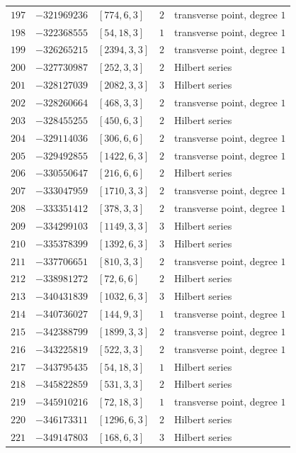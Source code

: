 \documentclass[11pt]{article}
\begin{document}
\begin{center}
\begin{longtable}{r r l c l}
$197$ & $-321969236$ & $[774,6,3]$ & $2$ & transverse point, degree $1$\\
$198$ & $-322368555$ & $[54,18,3]$ & $1$ & transverse point, degree $1$\\
$199$ & $-326265215$ & $[2394,3,3]$ & $2$ & transverse point, degree $1$\\
$200$ & $-327730987$ & $[252,3,3]$ & $2$ & Hilbert series\\
$201$ & $-328127039$ & $[2082,3,3]$ & $3$ & Hilbert series\\
$202$ & $-328260664$ & $[468,3,3]$ & $2$ & transverse point, degree $1$\\
$203$ & $-328455255$ & $[450,6,3]$ & $2$ & Hilbert series\\
$204$ & $-329114036$ & $[306,6,6]$ & $2$ & transverse point, degree $1$\\
$205$ & $-329492855$ & $[1422,6,3]$ & $2$ & transverse point, degree $1$\\
$206$ & $-330550647$ & $[216,6,6]$ & $2$ & Hilbert series\\
$207$ & $-333047959$ & $[1710,3,3]$ & $2$ & transverse point, degree $1$\\
$208$ & $-333351412$ & $[378,3,3]$ & $2$ & transverse point, degree $1$\\
$209$ & $-334299103$ & $[1149,3,3]$ & $3$ & Hilbert series\\
$210$ & $-335378399$ & $[1392,6,3]$ & $3$ & Hilbert series\\
$211$ & $-337706651$ & $[810,3,3]$ & $2$ & transverse point, degree $1$\\
$212$ & $-338981272$ & $[72,6,6]$ & $2$ & Hilbert series\\
$213$ & $-340431839$ & $[1032,6,3]$ & $3$ & Hilbert series\\
$214$ & $-340736027$ & $[144,9,3]$ & $1$ & transverse point, degree $1$\\
$215$ & $-342388799$ & $[1899,3,3]$ & $2$ & transverse point, degree $1$\\
$216$ & $-343225819$ & $[522,3,3]$ & $2$ & transverse point, degree $1$\\
$217$ & $-343795435$ & $[54,18,3]$ & $1$ & Hilbert series\\
$218$ & $-345822859$ & $[531,3,3]$ & $2$ & Hilbert series\\
$219$ & $-345910216$ & $[72,18,3]$ & $1$ & transverse point, degree $1$\\
$220$ & $-346173311$ & $[1296,6,3]$ & $2$ & Hilbert series\\
$221$ & $-349147803$ & $[168,6,3]$ & $3$ & Hilbert series\\

\end{longtable}
\end{center}
\end{document}
